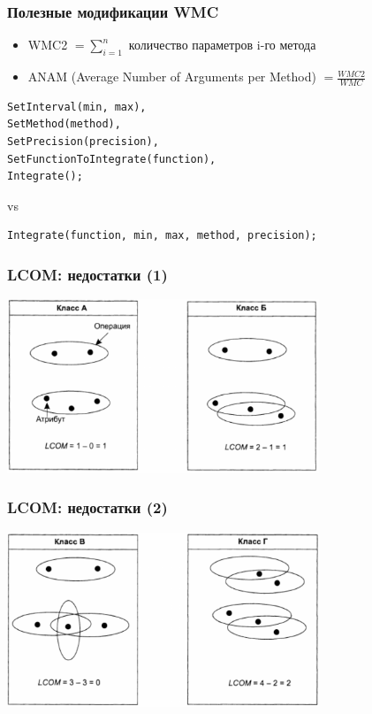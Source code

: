 \documentclass{../../slides-style}
\begin{document}
    \begin{frame}[fragile]
        \frametitle{Полезные модификации WMC}
        \begin{itemize}
            \item WMC2 $= \sum_{i=1}^{n}$ количество параметров i-го метода
            \item ANAM (Average Number of Arguments per Method) $= \frac{WMC2}{WMC}$
        \end{itemize}
        \begin{verbatim}
SetInterval(min, max),
SetMethod(method),
SetPrecision(precision),
SetFunctionToIntegrate(function),
Integrate();
        \end{verbatim}
        \vspace{5mm}
        vs
        \vspace{5mm}
        \begin{verbatim}
Integrate(function, min, max, method, precision);
        \end{verbatim}
    \end{frame}

    \begin{frame}
        \frametitle{LCOM: недостатки (1)}
        \begin{center}
            \includegraphics[width=0.7\textwidth]{lcomFail1.png}
        \end{center}
    \end{frame}

    \begin{frame}
        \frametitle{LCOM: недостатки (2)}
        \begin{center}
            \includegraphics[width=0.7\textwidth]{lcomFail2.png}
        \end{center}
    \end{frame}
\end{document}
